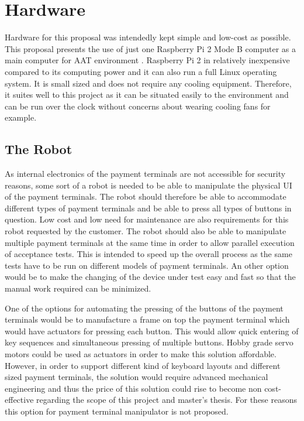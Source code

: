 \section{Hardware}
\label{section:Proposed hardware}

Hardware for this proposal was intendedly kept simple and low-cost as possible. This proposal presents the use of just one Raspberry Pi 2 Mode B computer as a main computer for AAT environment \emph{\citep{raspberry}}. Raspberry Pi 2 in relatively inexpensive compared to its computing power and it can also run a full Linux operating system. It is small sized and does not require any cooling equipment. Therefore, it suites well to this project as it can be situated easily to the environment and can be run over the clock without concerns about wearing cooling fans for example.

\FloatBarrier
\subsection{The Robot}
\label{subsection:The Robot proposal}

As internal electronics of the payment terminals are not accessible for security reasons, some sort of a robot is needed to be able to manipulate the physical UI of the payment terminals. The robot should therefore be able to accommodate different types of payment terminals and be able to press all types of buttons in question. Low cost and low need for maintenance are also requirements for this robot requested by the customer. The robot should also be able to manipulate multiple payment terminals at the same time in order to allow parallel execution of acceptance tests. This is intended to speed up the overall process as the same tests have to be run on different models of payment terminals. An other option would be to make the changing of the device under test easy and fast so that the manual work required can be minimized.

One of the options for automating the pressing of the buttons of the payment terminals would be to manufacture a frame on top the payment terminal which would have actuators for pressing each button. This would allow quick entering of key sequences and simultaneous pressing of multiple buttons. Hobby grade servo motors could be used as actuators in order to make this solution affordable. However, in order to support different kind of keyboard layouts and different sized payment terminals, the solution would require advanced mechanical engineering and thus the price of this solution could rise to become non cost-effective regarding the scope of this project and master's thesis. For these reasons this option for payment terminal manipulator is not proposed.

